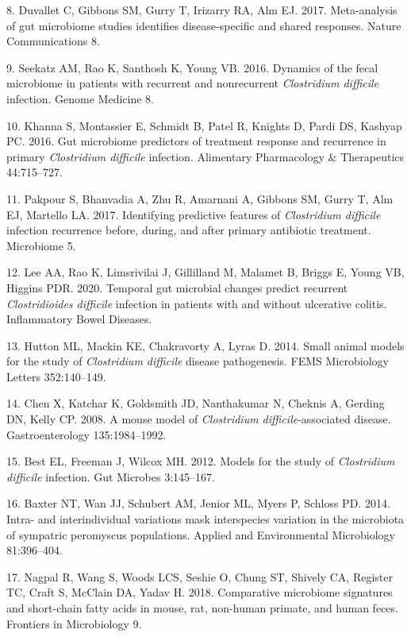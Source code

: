 \documentclass[11pt,]{article}
\begin{document}
\hypertarget{ref-Duvallet2017}{}
8. Duvallet C, Gibbons SM, Gurry T, Irizarry RA, Alm EJ. 2017.
Meta-analysis of gut microbiome studies identifies disease-specific and
shared responses. Nature Communications 8.

\hypertarget{ref-Seekatz2016}{}
9. Seekatz AM, Rao K, Santhosh K, Young VB. 2016. Dynamics of the fecal
microbiome in patients with recurrent and nonrecurrent \emph{Clostridium
difficile} infection. Genome Medicine 8.

\hypertarget{ref-Khanna2016}{}
10. Khanna S, Montassier E, Schmidt B, Patel R, Knights D, Pardi DS,
Kashyap PC. 2016. Gut microbiome predictors of treatment response and
recurrence in primary \emph{Clostridium difficile} infection. Alimentary
Pharmacology \& Therapeutics 44:715--727.

\hypertarget{ref-Pakpour2017}{}
11. Pakpour S, Bhanvadia A, Zhu R, Amarnani A, Gibbons SM, Gurry T, Alm
EJ, Martello LA. 2017. Identifying predictive features of
\emph{Clostridium difficile} infection recurrence before, during, and
after primary antibiotic treatment. Microbiome 5.

\hypertarget{ref-Lee2020}{}
12. Lee AA, Rao K, Limsrivilai J, Gillilland M, Malamet B, Briggs E,
Young VB, Higgins PDR. 2020. Temporal gut microbial changes predict
recurrent \emph{Clostridioides difficile} infection in patients with and
without ulcerative colitis. Inflammatory Bowel Diseases.

\hypertarget{ref-Hutton2014}{}
13. Hutton ML, Mackin KE, Chakravorty A, Lyras D. 2014. Small animal
models for the study of \emph{Clostridium difficile} disease
pathogenesis. FEMS Microbiology Letters 352:140--149.

\hypertarget{ref-Chen2008}{}
14. Chen X, Katchar K, Goldsmith JD, Nanthakumar N, Cheknis A, Gerding
DN, Kelly CP. 2008. A mouse model of \emph{Clostridium
difficile}-associated disease. Gastroenterology 135:1984--1992.

\hypertarget{ref-Best2012}{}
15. Best EL, Freeman J, Wilcox MH. 2012. Models for the study of
\emph{Clostridium difficile} infection. Gut Microbes 3:145--167.

\hypertarget{ref-Baxter2014}{}
16. Baxter NT, Wan JJ, Schubert AM, Jenior ML, Myers P, Schloss PD.
2014. Intra- and interindividual variations mask interspecies variation
in the microbiota of sympatric peromyscus populations. Applied and
Environmental Microbiology 81:396--404.

\hypertarget{ref-Nagpal2018}{}
17. Nagpal R, Wang S, Woods LCS, Seshie O, Chung ST, Shively CA,
Register TC, Craft S, McClain DA, Yadav H. 2018. Comparative microbiome
signatures and short-chain fatty acids in mouse, rat, non-human primate,
and human feces. Frontiers in Microbiology 9.
\end{document}
